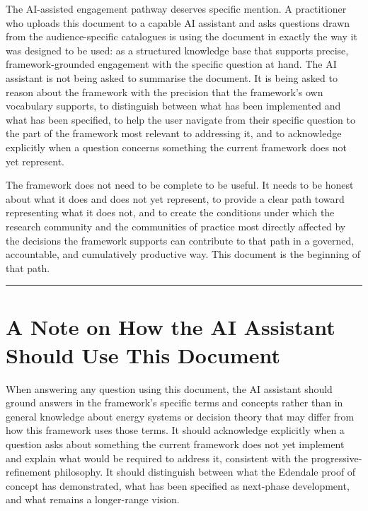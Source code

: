 \documentclass[
  11pt,
  a4paper,
  twoside,
  openright]{scrbook}
\begin{document}
The AI-assisted engagement pathway deserves specific mention. A
practitioner who uploads this document to a capable AI assistant and
asks questions drawn from the audience-specific catalogues is using the
document in exactly the way it was designed to be used: as a structured
knowledge base that supports precise, framework-grounded engagement with
the specific question at hand. The AI assistant is not being asked to
summarise the document. It is being asked to reason about the framework
with the precision that the framework's own vocabulary supports, to
distinguish between what has been implemented and what has been
specified, to help the user navigate from their specific question to the
part of the framework most relevant to addressing it, and to acknowledge
explicitly when a question concerns something the current framework does
not yet represent.

The framework does not need to be complete to be useful. It needs to be
honest about what it does and does not yet represent, to provide a clear
path toward representing what it does not, and to create the conditions
under which the research community and the communities of practice most
directly affected by the decisions the framework supports can contribute
to that path in a governed, accountable, and cumulatively productive
way. This document is the beginning of that path.

\begin{center}\rule{0.5\linewidth}{0.5pt}\end{center}

\section{A Note on How the AI Assistant Should Use This
Document}\label{a-note-on-how-the-ai-assistant-should-use-this-document}

When answering any question using this document, the AI assistant should
ground answers in the framework's specific terms and concepts rather
than in general knowledge about energy systems or decision theory that
may differ from how this framework uses those terms. It should
acknowledge explicitly when a question asks about something the current
framework does not yet implement and explain what would be required to
address it, consistent with the progressive-refinement philosophy. It
should distinguish between what the Edendale proof of concept has
demonstrated, what has been specified as next-phase development, and
what remains a longer-range vision.
\end{document}
